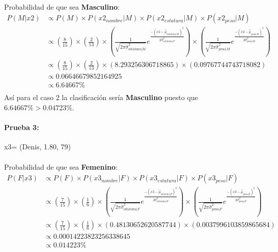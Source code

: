 \documentclass[12pt]{article}
\begin{document}
\paragraph{}Probabilidad de que sea \textbf{Masculino}:\\
\begin{equation}
\begin{split}
P(M|x2) &\propto P(M) \times P(x2_{nombre}|M) \times P(x2_{estatura}|M) \times P(x2_{peso}|M) \\
&\propto (\frac{8}{15}) \times (\frac{2}{13}) \times (\frac{1}{\sqrt{2\pi\hat{\sigma}_{\text{estatura}|M}^2}}e^{\frac{-(x2 - \hat{\mu}_{\text{estatura}|M})^2}{2\hat{\sigma}_{\text{estatura}|F}^2}}) \times (\frac{1}{\sqrt{2\pi\hat{\sigma}_{\text{peso}|M}^2}}e^{\frac{-(x2 - \hat{\mu}_{\text{peso}|M})^2}{2\hat{\sigma}_{\text{peso}|M}^2}}) \\
&\propto (\frac{8}{15}) \times (\frac{2}{13}) \times (8.293256306718865) \times (0.09767744743718082) \\
&\propto 0.06646679852164925 \\
&\propto 6.64667 \% \\
\end{split}
\end{equation}
Así para el caso 2 la clasificación sería \textbf{Masculino} puesto que $6.64667\% > 0.04723\%$.\\
\clearpage
\pagebreak
\paragraph{Prueba 3: }x3= (Denis, 1.80, 79)
\paragraph{}Probabilidad de que sea \textbf{Femenino}:\\
\begin{equation}
\begin{split}
P(F|x3) &\propto P(F) \times P(x3_{nombre}|F) \times P(x3_{estatura}|F) \times P(x3_{peso}|F) \\
&\propto (\frac{7}{15}) \times (\frac{1}{6}) \times (\frac{1}{\sqrt{2\pi\hat{\sigma}_{\text{estatura}|F}^2}}e^{\frac{-(x3 - \hat{\mu}_{\text{estatura}|F})^2}{2\hat{\sigma}_{\text{estatura}|F}^2}}) \times (\frac{1}{\sqrt{2\pi\hat{\sigma}_{\text{peso}|F}^2}}e^{\frac{-(x3 - \hat{\mu}_{\text{peso}|F})^2}{2\hat{\sigma}_{\text{peso}|F}^2}}) \\
&\propto (\frac{7}{15}) \times (\frac{1}{6}) \times (0.48130652620587744) \times (0.0037996103859865684) \\
&\propto 0.00014223823256338645 \\
&\propto 0.014223\% \\
\end{split}
\end{equation}
\end{document}
